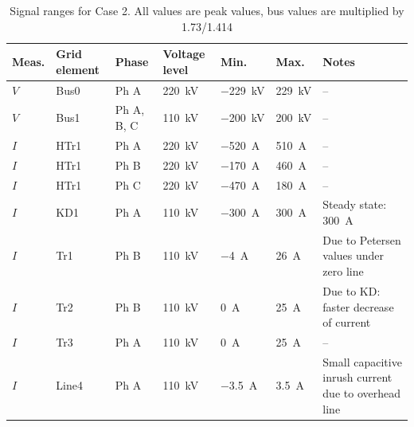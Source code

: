
\begin{table}[htbp]
  \centering
  \caption{Signal ranges for Case 2. All values are peak values, bus values are multiplied by 1.73/1.414}
  \label{tab:measurement-values-case2}
  \small
  \setlength{\tabcolsep}{3.5pt}
  \renewcommand{\arraystretch}{1.18}
  \begin{tabularx}{\textwidth}{@{}
      >{\raggedright\arraybackslash}p{}
      >{\raggedright\arraybackslash}p{}
      >{\raggedright\arraybackslash}p{}
      >{\raggedright\arraybackslash}p{}
      >{\raggedright\arraybackslash}p{}
      >{\raggedright\arraybackslash}p{}
      Y@{}}
    \toprule
    \textbf{Meas.} &
    \textbf{Grid element} &
    \textbf{Phase} &
    \textbf{Voltage level} &
    \textbf{Min.} &
    \textbf{Max.} &
    \textbf{Notes} \\
    \midrule
    $V$ & Bus0  & Ph A       & \SI{220}{\kilo\volt} & \SI{-229}{\kilo\volt} & \SI{229}{\kilo\volt} & -- \\
    $V$ & Bus1  & Ph A, B, C & \SI{110}{\kilo\volt} & \SI{-200}{\kilo\volt} & \SI{200}{\kilo\volt} & -- \\
    $I$ & HTr1  & Ph A       & \SI{220}{\kilo\volt} & \SI{-520}{\ampere} & \SI{510}{\ampere} & -- \\
    $I$ & HTr1  & Ph B       & \SI{220}{\kilo\volt} & \SI{-170}{\ampere} & \SI{460}{\ampere} & -- \\
    $I$ & HTr1  & Ph C       & \SI{220}{\kilo\volt} & \SI{-470}{\ampere} & \SI{180}{\ampere} & -- \\
    $I$ & KD1   & Ph A       & \SI{110}{\kilo\volt} & \SI{-300}{\ampere} & \SI{300}{\ampere} & Steady state: \SI{300}{\ampere} \\
    $I$ & Tr1   & Ph B       & \SI{110}{\kilo\volt} & \SI{-4}{\ampere} & \SI{26}{\ampere} & Due to Petersen values under zero line \\
    $I$ & Tr2   & Ph B       & \SI{110}{\kilo\volt} & \SI{0}{\ampere} & \SI{25}{\ampere} & Due to KD: faster decrease of current \\
    $I$ & Tr3   & Ph A      & \SI{110}{\kilo\volt} & \SI{0}{\ampere} & \SI{25}{\ampere} & -- \\
    $I$ & Line4 & Ph A & \SI{110}{\kilo\volt} & \SI{-3.5}{\ampere} & \SI{3.5}{\ampere} & Small capacitive inrush current due to overhead line \\

\end{tabularx}
\end{table}
